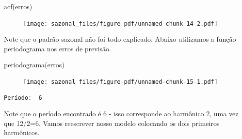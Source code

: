 \documentclass[
  letterpaper,
  DIV=11,
  numbers=noendperiod]{scrreprt}
\newenvironment{Shaded}{\begin{snugshade}}{\end{snugshade}}
\newcommand{\DecValTok}[1]{\textcolor[rgb]{0.68,0.00,0.00}{#1}}
\newcommand{\FunctionTok}[1]{\textcolor[rgb]{0.28,0.35,0.67}{#1}}
\newcommand{\NormalTok}[1]{\textcolor[rgb]{0.00,0.23,0.31}{#1}}
\newcommand{\OtherTok}[1]{\textcolor[rgb]{0.00,0.23,0.31}{#1}}
\newcommand{\SpecialCharTok}[1]{\textcolor[rgb]{0.37,0.37,0.37}{#1}}
\begin{document}
\begin{Shaded}
\begin{Highlighting}[]
\FunctionTok{acf}\NormalTok{(erros)}
\end{Highlighting}
\end{Shaded}

\begin{figure}[H]

{\centering \texttt{[image: sazonal\_files/figure-pdf/unnamed-chunk-14-2.pdf]}

}

\end{figure}

Note que o padrão sazonal não foi todo explicado. Abaixo utilizamos a
função periodograma nos erros de previsão.

\begin{Shaded}
\begin{Highlighting}[]
\FunctionTok{periodograma}\NormalTok{(erros)}
\end{Highlighting}
\end{Shaded}

\begin{figure}[H]

{\centering \texttt{[image: sazonal\_files/figure-pdf/unnamed-chunk-15-1.pdf]}

}

\end{figure}

\begin{verbatim}
Período:  6 
\end{verbatim}

Note que o período encontrado é 6 - isso corresponde ao harmônico 2, uma
vez que 12/2=6. Vamos reescrever nosso modelo colocando os dois
primeiros harmônicos.

\begin{Shaded}
\end{Shaded}
\end{document}
